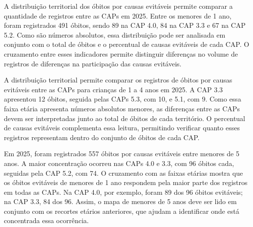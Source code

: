 
A distribuição territorial dos óbitos por causas evitáveis permite comparar a quantidade de registros entre as CAPs em 2025. Entre os menores de 1 ano, foram registrados 491 óbitos, sendo 89 na CAP 4.0, 84 na CAP 3.3 e 67 na CAP 5.2. Como são números absolutos, essa distribuição pode ser analisada em conjunto com o total de óbitos e o percentual de causas evitáveis de cada CAP. O cruzamento entre esses indicadores permite distinguir diferenças no volume de registros de diferenças na participação das causas evitáveis.


A distribuição territorial permite comparar os registros de óbitos por causas evitáveis entre as CAPs para crianças de 1 a 4 anos em 2025. A CAP 3.3 apresentou 12 óbitos, seguida pelas CAPs 5.3, com 10, e 5.1, com 9. Como essa faixa etária apresenta números absolutos menores, as diferenças entre as CAPs devem ser interpretadas junto ao total de óbitos de cada território. O percentual de causas evitáveis complementa essa leitura, permitindo verificar quanto esses registros representam dentro do conjunto de óbitos de cada CAP.


Em 2025, foram registrados 557 óbitos por causas evitáveis entre menores de 5 anos. A maior concentração ocorreu nas CAPs 4.0 e 3.3, com 96 óbitos cada, seguidas pela CAP 5.2, com 74. O cruzamento com as faixas etárias mostra que os óbitos evitáveis de menores de 1 ano respondem pela maior parte dos registros em todas as CAPs. Na CAP 4.0, por exemplo, foram 89 dos 96 óbitos evitáveis; na CAP 3.3, 84 dos 96. Assim, o mapa de menores de 5 anos deve ser lido em conjunto com os recortes etários anteriores, que ajudam a identificar onde está concentrada essa ocorrência.

